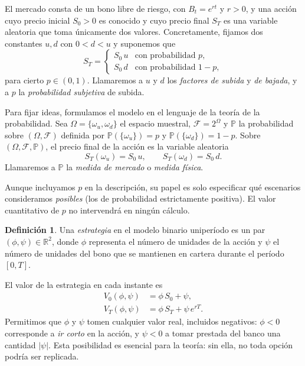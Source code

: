 \documentclass[11pt,a4paper,oneside]{report}
\theoremstyle{plain}
\theoremstyle{definition}
\newtheorem{definicion}[teorema]{Definición}
\theoremstyle{remark}
\newcommand{\R}{\mathbb{R}}
\newcommand{\PP}{\mathbb{P}}
\newcommand{\F}{\mathcal{F}}
\newcommand{\1}{\mathbf{1}}
\begin{document}
El mercado consta de un bono
libre de riesgo, con $B_t = e^{rt}$ y $r > 0$, y una acción cuyo precio
inicial $S_0 > 0$ es conocido y cuyo precio final $S_T$ es una variable
aleatoria que toma únicamente dos valores. Concretamente, fijamos dos
constantes $u, d$ con $0 < d < u$ y suponemos que
\begin{equation*}
  S_T = \begin{cases}
    S_0\, u & \text{con probabilidad } p, \\[2pt]
    S_0\, d & \text{con probabilidad } 1 - p,
  \end{cases}
\end{equation*}
para cierto $p \in (0, 1)$. Llamaremos a $u$ y $d$ los \emph{factores
de subida} y \emph{de bajada}, y a $p$ la \emph{probabilidad subjetiva}
de subida.

Para fijar ideas, formulamos el modelo en el lenguaje
de la teoría de la probabilidad. Sea $\Omega = \{\omega_u, \omega_d\}$
el espacio muestral, $\F = 2^{\Omega}$ y $\PP$ la probabilidad sobre
$(\Omega, \F)$ definida por $\PP(\{\omega_u\}) = p$ y $\PP(\{\omega_d\})
= 1 - p$. Sobre $(\Omega, \F, \PP)$, el precio final de la acción es la
variable aleatoria
\begin{equation*}
  S_T(\omega_u) = S_0\, u, \qquad S_T(\omega_d) = S_0\, d.
\end{equation*}
Llamaremos a $\PP$ la \emph{medida de mercado} o \emph{medida física}.

Aunque incluyamos $p$ en la descripción, su papel es solo especificar
qué escenarios consideramos \emph{posibles} (los de probabilidad
estrictamente positiva). El valor cuantitativo de $p$ no intervendrá
en ningún cálculo.

\begin{definicion}
Una \emph{estrategia} en el modelo binario uniperíodo es un par
$(\phi, \psi) \in \R^2$, donde $\phi$ representa el número de unidades
de la acción y $\psi$ el número de unidades del bono que se mantienen
en cartera durante el período $[0, T]$.
\end{definicion}

El valor de la estrategia en cada instante es
\begin{align*}
  V_0(\phi, \psi)   &= \phi\, S_0 + \psi, \\
  V_T(\phi, \psi)   &= \phi\, S_T + \psi\, e^{rT}.
\end{align*}
Permitimos que $\phi$ y $\psi$ tomen cualquier valor real, incluidos
negativos: $\phi < 0$ corresponde a \emph{ir corto} en la acción, y
$\psi < 0$ a tomar prestada del banco una cantidad $|\psi|$. Esta
posibilidad es esencial para la teoría: sin ella, no toda opción podría
ser replicada.
\end{document}
